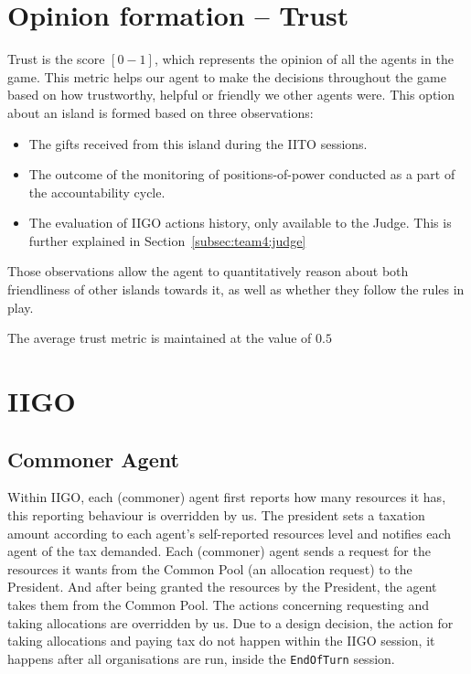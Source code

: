 \section{Opinion formation -- Trust}
\label{sec:team4:trust}
Trust is the score $[0-1]$, which represents the opinion of all the agents in the game. This metric helps our agent to make the decisions throughout the game based on how trustworthy, helpful or friendly we other agents were. This option about an island is formed based on three observations:
\begin{itemize}
    \item The gifts received from this island during the IITO sessions.
    \item The outcome of the monitoring of positions-of-power conducted as a part of the accountability cycle.
    \item The evaluation of IIGO actions history, only available to the Judge. This is further explained in Section~\ref{subsec:team4:judge}
\end{itemize}
Those observations allow the agent to quantitatively reason about both friendliness of other islands towards it, as well as whether they follow the rules in play.

The average trust metric is maintained at the value of $0.5$






\section{IIGO}
\subsection{Commoner Agent}
Within IIGO, each (commoner) agent first reports how many resources it has, this reporting behaviour is overridden by us. The president sets a taxation amount according to each agent's self-reported resources level and notifies each agent of the tax demanded. Each (commoner) agent sends a request for the resources it wants from the Common Pool (an allocation request) to the President. And after being granted the resources by the President, the agent takes them from the Common Pool. The actions concerning requesting and taking allocations are overridden by us. Due to a design decision, the action for taking allocations and paying tax do not happen within the IIGO session, it happens after all organisations are run, inside the \texttt{EndOfTurn} session.


